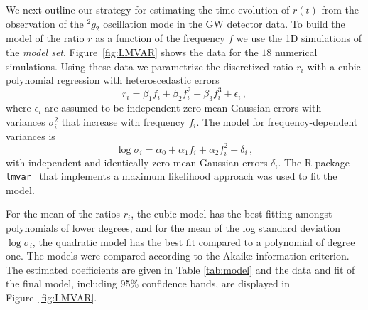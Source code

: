 We next outline our strategy for estimating the time evolution of $r(t)$
from the observation of the $\mbox{}^2g_2$ oscillation mode in the GW detector data.
To build the model of the ratio $r$ as a function of the frequency $f$ we use the 
1D simulations of the {\it model set}. Figure~\ref{fig:LMVAR}
shows the data for the $18$ numerical simulations. 
Using these data we parametrize the discretized ratio $r_i$ with a cubic polynomial
regression with heteroscedastic errors
\begin{equation}
\label{eq:model1}
r_i=\beta_1 f_i + \beta_2 f_i^2 +\beta_3 f_i^3 + \epsilon_i\,,
\end{equation}
where $\epsilon_i$ are assumed to be independent zero-mean Gaussian errors with
variances $\sigma_i^2$ that increase with frequency $f_i$. The model for frequency-dependent
variances is
\begin{equation}
\log \sigma_i=\alpha_0+ \alpha_1 f_i + \alpha_2 f_i^2 + \delta_i\,,
\end{equation}
with independent and identically zero-mean Gaussian errors $\delta_i$. The R-package \texttt{lmvar}~\citep{lmvar:2019} that implements a maximum likelihood approach was used to fit the model.

For the mean of the ratios $r_i$, the cubic model has the best fitting amongst polynomials of lower degrees, and for the mean of the log standard deviation $\log\sigma_i$, the quadratic model has the best fit compared to a polynomial of degree one. The models were compared according to the Akaike information criterion.  The estimated coefficients are given in Table \ref{tab:model} and the data and fit of the final model, including 95\% confidence bands, are displayed in Figure~\ref{fig:LMVAR}.

